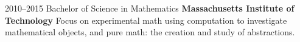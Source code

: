 \documentclass[11pt]{friggeri-cv} %
\begin{document}
\begin{entrylist}


\entry
{2010--2015}
{Bachelor of Science in Mathematics}
{\textbf{Massachusetts Institute of Technology}}
{%
Focus on experimental math using computation to investigate mathematical objects, and pure math: the creation and study of abstractions.
}
\end{entrylist}

\end{document}

